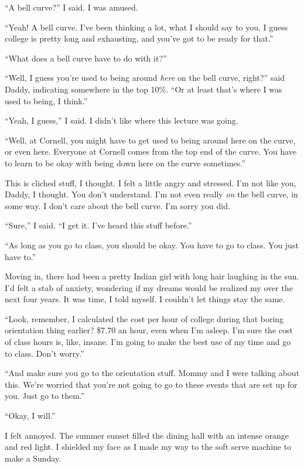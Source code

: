``A bell curve?'' I said.  I was amused.

``Yeah!  A bell curve.  I've been thinking a lot, what I should say to you.  I
guess college is pretty long and exhausting, and you've got to be ready for that.''  

``What does a bell curve have to do with it?''

``Well, I guess you're used to being around \textit{here} on the bell curve,
right?'' said Daddy, indicating somewhere in the top 10\%.  ``Or at least that's
where I was used to being, I think.''  

``Yeah, I guess,'' I said.  I didn't like where this lecture was going.

``Well, at Cornell, you might have to get used to being around here on the
curve, or even here.  Everyone at Cornell comes from the top end of the curve.
You have to learn to be okay with being down here on the curve sometimes.''


This is cliched stuff, I thought.  I felt a little angry and stressed.  I'm not
like you, Daddy, I thought.  You don't understand.  I'm not even really
\textit{on} the bell curve, in some way.  I don't care about the bell curve.
I'm sorry you did.


``Sure,'' I said.  ``I get it.  I've heard this stuff before.''

``As long as you go to class, you should be okay.  You have to go to class.  You
just have to.''

Moving in, there had been a pretty Indian girl with long hair laughing in the
sun.  I'd felt a stab of anxiety, wondering if my dreams would be realized my
over the next four years.  It was time, I told myself.  I couldn't let things
stay the same.

``Look, remember, I calculated the cost per hour of college during that boring
orientation thing earlier?  \$7.70 an hour, even when I'm asleep.  I'm sure the
cost of class hours is, like, insane.  I'm going to make the best use of my time
and go to class. Don't worry.''

``And make sure you go to the orientation stuff.  Mommy and I were talking about
this.  We're worried that you're not going to go to these events that are set up
for you.  Just go to them.''

``Okay, I will.''

I felt annoyed.  The summer sunset filled the dining hall with an intense orange
and red light.  I shielded my face as I made my way to the soft serve machine to
make a Sunday.


